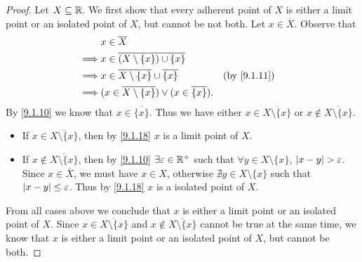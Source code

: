 \begin{proof}
  Let \(X \subseteq \mathbb{R}\).
  We first show that every adherent point of \(X\) is either a limit point or an isolated point of \(X\), but cannot be not both.
  Let \(x \in \overline{X}\).
  Observe that
  \begin{align*}
             & x \in \overline{X}                                                                   \\
    \implies & x \in \overline{(X \setminus \{x\}) \cup \{x\}}                                      \\
    \implies & x \in \overline{X \setminus \{x\}} \cup \overline{\{x\}}            &  & \by{9.1.11} \\
    \implies & (x \in \overline{X \setminus \{x\}}) \lor (x \in \overline{\{x\}}).
  \end{align*}
  By \cref{9.1.10} we know that \(x \in \overline{\{x\}}\).
  Thus we have either \(x \in \overline{X \setminus \{x\}}\) or \(x \notin \overline{X \setminus \{x\}}\).
  \begin{itemize}
    \item If \(x \in \overline{X \setminus \{x\}}\), then by \cref{9.1.18} \(x\) is a limit point of \(X\).
    \item If \(x \notin \overline{X \setminus \{x\}}\), then by \cref{9.1.10} \(\exists \varepsilon \in \mathbb{R}^+\) such that \(\forall y \in X \setminus \{x\}\), \(\left\lvert x - y\right\rvert > \varepsilon\).
          Since \(x \in \overline{X}\), we must have \(x \in X\), otherwise \(\nexists y \in X \setminus \{x\}\) such that \(\left\lvert x - y\right\rvert \leq \varepsilon\).
          Thus by \cref{9.1.18} \(x\) is a isolated point of \(X\).
  \end{itemize}
  From all cases above we conclude that \(x\) is either a limit point or an isolated point of \(X\).
  Since \(x \in \overline{X \setminus \{x\}}\) and \(x \notin \overline{X \setminus \{x\}}\) cannot be true at the same time, we know that \(x\) is either a limit point or an isolated point of \(X\), but cannot be both.


\end{proof}
